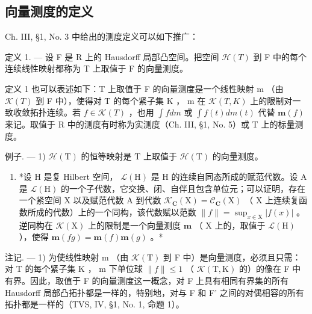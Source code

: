 \subsection{向量测度的定义}

Ch. III, §1, No. 3 中给出的测度定义可以如下推广：

定义 1. --- 设 F 是 R 上的 Hausdorff 局部凸空间。把空间 \(\mathcal{H}(T)\) 到 F 中的每个连续线性映射都称为 T 上取值于 F 的向量测度。

定义 1 也可以表述如下：T 上取值于 F 的向量测度是一个线性映射 m （由 \(\mathcal{K}(T)\) 到 F 中），使得对 T 的每个紧子集 K ， m 在 \(\mathcal{K}(T,K)\) 上的限制对一致收敛拓扑连续。若 \(f \in \mathcal{K}(T)\) ，也用 \(\int f dm\) 或 \(\int f(t) dm(t)\) 代替 \(\mathbf{m}(f)\) 来记。取值于 R 中的测度有时称为实测度（Ch. III, §1, No. 5）或 T 上的标量测度。

例子. --- 1) \(\mathcal{H}(\mathrm{T})\) 的恒等映射是 \(\mathrm{T}\) 上取值于 \(\mathcal{H}(\mathrm{T})\) 的向量测度。

\begin{enumerate}
\def\labelenumi{\arabic{enumi})}
\setcounter{enumi}{1}
\tightlist
\item
  *设 H 是复 Hilbert 空间， \(\mathcal{L}(\mathrm{H})\) 是 H 的连续自同态所成的赋范代数。设 A 是 \(\mathcal{L}(\mathrm{H})\) 的一个子代数，它交换、闭、自伴且包含单位元；可以证明，存在一个紧空间 X 以及赋范代数 A 到代数 \(\mathcal{K}_{\mathbf{C}}(\mathrm{X}) = \mathcal{C}_{\mathbf{C}}(\mathrm{X})\) （ X 上连续复函数所成的代数）上的一个同构，该代数赋以范数 \(\| f \| = \sup_{x \in \mathrm{X}} |f(x)|\) 。逆同构在 \(\mathcal{K}(\mathrm{X})\) 上的限制是一个向量测度 \(\mathbf{m}\) （ X 上的，取值于 \(\mathcal{L}(\mathrm{H})\) ），使得 \(\mathbf{m}(fg) = \mathbf{m}(f)\mathbf{m}(g)\) 。*
\end{enumerate}

注记. --- 1) 为使线性映射 m （由 \(\mathcal{K}(\mathrm{T})\) 到 F 中）是向量测度，必须且只需：对 T 的每个紧子集 K ， m 下单位球 \(\|f\|\leqslant1\) （ \(\mathcal{K}(\mathrm{T},\mathrm{K})\) 的）的像在 F 中有界。因此，取值于 F 的向量测度这一概念，对 F 上具有相同有界集的所有 Hausdorff 局部凸拓扑都是一样的，特别地，对与 F 和 F' 之间的对偶相容的所有拓扑都是一样的（TVS, IV, §1, No. 1, 命题 1）。

